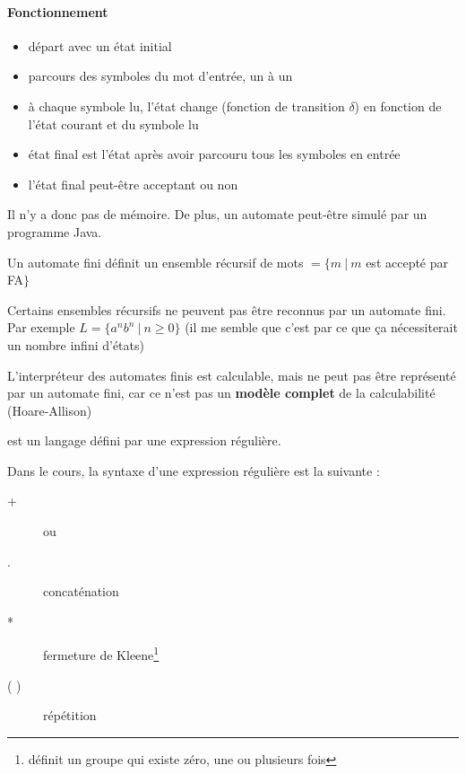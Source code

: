 \paragraph{Fonctionnement}
\begin{itemize}
	\item départ avec un état initial
	\item parcours des symboles du mot d'entrée, un à un
	\item à chaque symbole lu, l'état change (fonction de transition 
		$\delta$) en fonction de l'état courant et du symbole lu
	\item état final est l'état après avoir parcouru tous les symboles en 
		entrée
	\item l'état final peut-être acceptant ou non
\end{itemize}

\begin{myrem}
	Il n'y a donc pas de mémoire. De plus, un automate peut-être simulé 
	par un programme Java.
\end{myrem}

\begin{myprop}
	Un automate fini définit un ensemble récursif de mots $=\{m \ |\ m$ est 
		accepté par FA$\}$
\end{myprop}

\begin{myprop}
	Certains ensembles récursifs ne peuvent pas être reconnus par un 
	automate fini. Par exemple $L = \{ a^n b^n \ | \ n\geq 0\}$ (il me semble que 
	c'est par ce que ça nécessiterait un nombre infini d'états)
\end{myprop}

\begin{myprop}
	L'interpréteur des automates finis est calculable, mais ne peut pas être 
	représenté par un automate fini, car ce n'est pas un \textbf{modèle 
	complet} de la calculabilité (Hoare-Allison)
\end{myprop}

\begin{mydef} est un langage défini par une expression 
	régulière.
\end{mydef}

\begin{mydef} 
       	Dans le cours, la syntaxe d'une expression régulière est la suivante :
	\begin{description}
		\item[+] ou
		\item[.] concaténation
		\item[*] fermeture de Kleene\footnote{définit un groupe qui existe zéro, une ou plusieurs fois}
		\item[( )] répétition
	\end{description}
\end{mydef}

